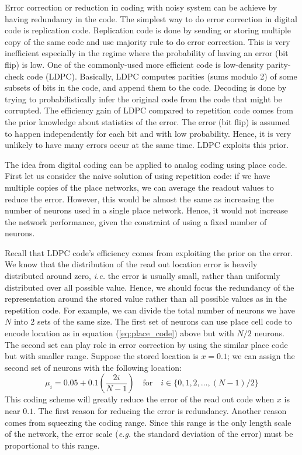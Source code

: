 Error correction or reduction in coding with noisy system can be achieve by having redundancy in the code. The simplest way to do error correction in digital code is replication code. Replication code is done by sending or storing multiple copy of the same code and use majority rule to do error correction. This is very inefficient especially in the regime where the probability of having an error (bit flip) is low. One of the commonly-used more efficient code is low-density parity-check code (LDPC). Basically, LDPC computes parities (sums modulo 2) of some subsets of bits in the code, and append them to the code. Decoding is done by trying to probabilistically infer the original code from the code that might be corrupted. The efficiency gain of LDPC compared to repetition code comes from the prior knowledge about statistics of the error. The error (bit flip) is assumed to happen independently for each bit and with low probability. Hence, it is very unlikely to have many errors occur at the same time. LDPC exploits this prior.

The idea from digital coding can be applied to analog coding using place code. First let us consider the naive solution of using repetition code: if we have multiple copies of the place networks, we can average the readout values to reduce the error. However, this would be almost the same as increasing the number of neurons used in a single place network. Hence, it would not increase the network performance, given the constraint of using a fixed number of neurons.

Recall that LDPC code's efficiency comes from exploiting the prior on the error. We know that the distribution of the read out location error is heavily distributed around zero, \textit{i.e.} the error is usually small, rather than uniformly distributed over all possible value. Hence, we should focus the redundancy of the representation around the stored value rather than all possible values as in the repetition code. For example, we can divide the total number of neurons we have $N$ into 2 sets of the same size. The first set of neurons can use place cell code to encode location as in equation (\ref{eq:place_code}) above but with $N/2$ neurons. The second set can play role in error correction by using the similar place code but with smaller range. Suppose the stored location is $x=0.1$; we can assign the second set of neurons with the following location:
\begin{equation}
\mu_i = 0.05 + 0.1\left(\frac{2i}{N - 1}\right)
	\quad\text{for}\quad i \in \{0, 1, 2, \dots, (N-1)/2\}
\end{equation}
This coding scheme will greatly reduce the error of the read out code when $x$ is near $0.1$. The first reason for reducing the error is redundancy. Another reason comes from squeezing the coding range. Since this range is the only length scale of the network, the error scale (\textit{e.g.} the standard deviation of the error) must be proportional to this range.

